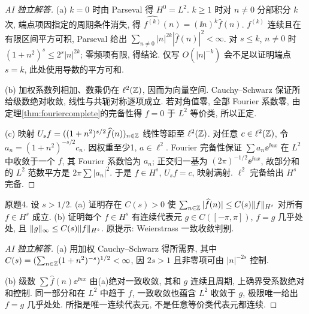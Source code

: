 \begin{proof}[AI 独立解答]
(a) $k=0$ 时由 Parseval 得 $H^0=L^2$. $k\ge1$ 时对 $n\ne0$ 分部积分 $k$ 次, 端点项因指定的周期条件消失, 得 $\widehat{f^{(k)}}(n)=(\ii n)^k\widehat f(n)$. $f^{(k)}$ 连续且在有限区间平方可积, Parseval 给出 $\sum_{n\ne0}|n|^{2k}|\widehat f(n)|^2<\infty$. 对 $s\le k$, $n\ne0$ 时 $(1+n^2)^s\le2^s|n|^{2k}$; 零频项有限, 得结论. 仅写 $O(|n|^{-k})$ 会不足以证明端点 $s=k$, 此处使用导数的平方可和.

(b) 加权系数列相加、数乘仍在 $\ell^2(\mathbb Z)$, 因而为向量空间. Cauchy--Schwarz 保证所给级数绝对收敛, 线性与共轭对称逐项成立. 若对角值零, 全部 Fourier 系数零, 由定理\ref{thm:fouriercomplete}的完备性得 $f=0$ 于 $L^2$ 等价类, 所以正定.

(c) 映射 $U_sf=((1+n^2)^{s/2}\widehat f(n))_{n\in\mathbb Z}$ 线性等距至 $\ell^2(\mathbb Z)$. 对任意 $c\in\ell^2(\mathbb Z)$, 令 $a_n=(1+n^2)^{-s/2}c_n$. 因权重至少1, $a\in\ell^2$. Fourier 完备性保证 $\sum a_n\ee^{\ii nx}$ 在 $L^2$ 中收敛于一个 $f$, 其 Fourier 系数恰为 $a_n$; 正交归一基为 $(2\pi)^{-1/2}\ee^{\ii nx}$, 故部分和的 $L^2$ 范数平方是 $2\pi\sum|a_n|^2$. 于是 $f\in H^s$, $U_sf=c$, 映射满射. $\ell^2$ 完备给出 $H^s$ 完备.
\end{proof}
\begin{exercise}\label{ps08:4}
原题4. 设 $s>1/2$. (a) 证明存在 $C(s)>0$ 使 $\sum_{n\in\mathbb Z}|\widehat f(n)|\le C(s)\lVert f\rVert_{H^s}$ 对所有 $f\in H^s$ 成立. (b) 证明每个 $f\in H^s$ 有连续代表元 $g\in C([-\pi,\pi])$, $f=g$ 几乎处处, 且 $\lVert g\rVert_\infty\le C(s)\lVert f\rVert_{H^s}$. 原提示: Weierstrass 一致收敛判别.
\end{exercise}
\begin{proof}[AI 独立解答]
(a) 用加权 Cauchy--Schwarz 得所需界, 其中 $C(s)=(\sum_{n\in\mathbb Z}(1+n^2)^{-s})^{1/2}<\infty$, 因 $2s>1$ 且非零项可由 $|n|^{-2s}$ 控制.

(b) 级数 $\sum\widehat f(n)\ee^{\ii nx}$ 由(a)绝对一致收敛, 其和 $g$ 连续且周期, 上确界受系数绝对和控制. 同一部分和在 $L^2$ 中趋于 $f$, 一致收敛也蕴含 $L^2$ 收敛于 $g$, 极限唯一给出 $f=g$ 几乎处处. 所指是唯一连续代表元, 不是任意等价类代表元都连续.
\end{proof}
